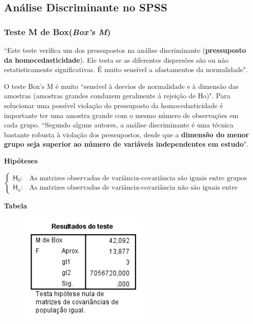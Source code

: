 	\subsection{Análise Discriminante no SPSS \cite{torres}}

		\subsubsection{Teste M de Box(\textit{Box's M})}

			``Este teste verifica um dos pressupostos na análise discriminante (\textbf{pressuposto da homocedasticidade}). Ele testa se as diferentes dispersões são ou não estatisticamente significativas. É muito sensível a afastamentos da normalidade".

			O teste Box's M é muito ``sensível à desvios de normalidade e à dimensão das amostras (amostras grandes conduzem geralmente à rejeição de Ho)". Para solucionar uma possível violação do pressuposto da homocedasticidade  é importante ter uma amostra grande com o mesmo número de observações em cada grupo. ``Segundo alguns autores, a análise discriminante é uma técnica bastante robusta à violação dos pressupostos, desde que a \textbf{dimensão do menor grupo seja superior ao número de variáveis independentes em estudo}".

			\bigskip

			\textbf{Hipóteses}

				\bigskip

				$
					\begin{cases}

					\mathsf{H}_{0} : & \text{As matrizes observadas de variância-covariância são iguais entre grupos} \\
					\mathsf{H}_{a} : & \text{As matrizes observadas de variância-covariância não são iguais entre grupos}

					\end{cases}
				$

			\bigskip \bigskip

			\textbf{Tabela}

				\begin{figure}[H]
					\centering
					\includegraphics[height=5.5cm]{images/analise-discriminante_teste-box-s-m}
				\end{figure}
				
